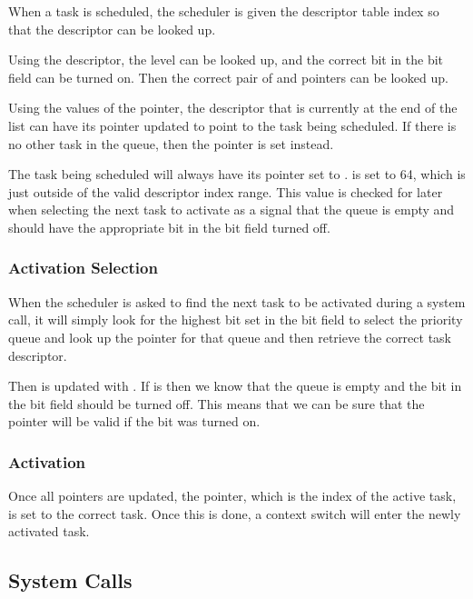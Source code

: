 \documentclass[pdftex,10pt,a4paper]{article}
\begin{document}
When a task is scheduled, the scheduler is given the descriptor table
index so that the descriptor can be looked up.

Using the descriptor, the  level can be looked up, and
the correct bit in the bit field can be turned on. Then the correct
pair of  and  pointers can be looked up.

Using the values of the  pointer, the descriptor that is
currently at the end of the list can have its  pointer
updated to point to the task being scheduled. If there is no other
task in the queue, then the  pointer is set instead.

The task being scheduled will always have its  pointer set
to .  is set to 64, which is just
outside of the valid descriptor index range. This value is checked for
later when selecting the next task to activate as a signal that the
queue is empty and should have the appropriate bit in the bit field
turned off.

\subsubsection*{Activation Selection}

When the scheduler is asked to find the next task to be activated
during a system call, it will simply look for the highest bit set in
the bit field to select the priority queue and look up the 
pointer for that queue and then retrieve the correct task descriptor.

Then  is updated with . If 
is  then we know that the queue is empty and the bit
in the bit field should be turned off. This means that we can be sure
that the  pointer will be valid if the bit was turned on.

\subsubsection*{Activation}

Once all pointers are updated, the  pointer, which
is the index of the active task, is set to the correct task. Once this
is done, a context switch will enter the newly activated task.

\subsection*{System Calls}
\end{document}
